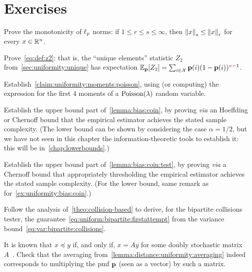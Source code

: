 \section{Exercises}
\begin{question}\label{ex:identity:monotonicity:lp}
  Prove the monotonicity of $\lp[p]$ norms: if $1\leq r\leq s \leq \infty$, then $\norm{x}_s \leq \norm{x}_r$ for every $x\in \R^n$.
\end{question}
\begin{question}\label{ex:expectation:z2} 
  Prove~\cref{eq:def:z2}: that is, the ``unique elements'' statistic $Z_2$ from~\cref{sec:uniformity:unique} has expectation $\bE{\p}{Z_2} = \sum_{i\in\domain} \p(i)(1-\p(i))^{\ns-1}$.
\end{question}
\begin{question}\label{ex:uniformity:moments:poisson}
  Establish~\cref{claim:uniformity:moments:poisson}, using (or computing) the expression for the first 4 moments of a $\poisson{\lambda}$ random variable.
\end{question}
\begin{question}\label{ex:uniformity:bias:coin}
  Establish the upper bound part of~\cref{lemma:bias:coin}, by proving \textit{via} an Hoeffding or Chernoff bound that the empirical estimator achieves the stated sample complexity. (The lower bound can be shown by considering the case $\alpha=1/2$, but we have not seen in this chapter the information-theoretic tools to establish it: this will be in~\cref{chap:lowerbounds}.)
\end{question}
\begin{question}\label{ex:uniformity:bias:coin:testing}
  Establish the upper bound part of~\cref{lemma:bias:coin:test}, by proving \textit{via} a Chernoff bound that appropriately thresholding the empirical estimator achieves the stated sample complexity. (For the lower bound, same remark as for~\cref{ex:uniformity:bias:coin}.)
\end{question}
\begin{question}\label{ex:uniformity:bipartite}
  Follow the analysis of~\cref{theo:collision-based} to derive, for the bipartite collisions tester, the guarantee~\cref{eq:uniform:bipartite:firstattempt} from the variance bound~\cref{eq:var:bipartite:collisions}.
\end{question}
\begin{question}\label{ex:identity:averaging:stochastic} 
    It is known that $x\preceq y$ if, and only if, $x=Ay$ for some doubly stochastic matrix $A$~\citep[Theorem~2.1]{Arnold87}. Check that the averaging from~\cref{lemma:distance:uniformity:averaging} indeed corresponds to multiplying the pmf $\p$ (seen as a vector) by such a matrix.
\end{question}
